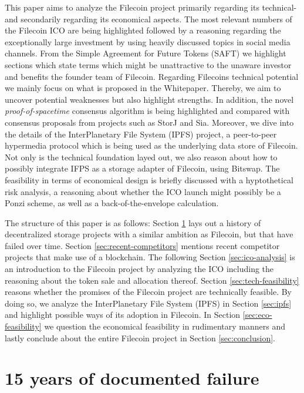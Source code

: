 \documentclass[conference]{IEEEtran}
\begin{document}
This paper aims to analyze the Filecoin project primarily regarding its technical- and secondarily regarding its economical aspects.
The most relevant numbers of the Filecoin ICO are being highlighted followed by a reasoning regarding the exceptionally large investment by using heavily discussed topics in social media channels.
From the Simple Agreement for Future Tokens (SAFT) we highlight sections which state terms which might be unattractive to the unaware investor and benefits the founder team of Filecoin.
Regarding Filecoins technical potential we mainly focus on what is proposed in the Whitepaper\cite{filecoin}.
Thereby, we aim to uncover potential weaknesses but also highlight strengths.
In addition, the novel \textit{proof-of-spacetime} consensus algorithm is being highlighted and compared with consensus proposals from projects such as StorJ and Sia.
Moreover, we dive into the details of the InterPlanetary File System (IPFS) project, a peer-to-peer hypermedia protocol which is being used as the underlying data store of Filecoin.
Not only is the technical foundation layed out, we also reason about how to possibly integrate IFPS as a storage adapter of Filecoin, using Bitswap\cite{bitswap}.
The feasibility in terms of economical design is briefly discussed with a hyptothetical risk analysis, a reasoning about whether the ICO launch might possibly be a Ponzi scheme, as well as a back-of-the-envelope calculation.

The structure of this paper is as follows: Section \ref{sec:documented-failure} lays out a history of decentralized storage projects with a similar ambition as Filecoin, but that have failed over time. 
Section \ref{sec:recent-competitors} mentions recent competitor projects that make use of a blockchain.
The following Section \ref{sec:ico-analysis} is an introduction to the Filecoin project by analyzing the ICO including the reasoning about the token sale and allocation thereof.
Section \ref{sec:tech-feasibility} reasons whether the promises of the Filecoin project are technically feasible.
By doing so, we analyze the InterPlanetary File System (IPFS)\cite{ipfs-whitepaper} in Section \ref{sec:ipfs} and highlight possible ways of its adoption in Filecoin.
In Section \ref{sec:eco-feasibility} we question the economical feasibility in rudimentary manners and lastly conclude about the entire Filecoin project in Section \ref{sec:conclusion}.


\section{15 years of documented failure}
\label{sec:documented-failure}
\end{document}
